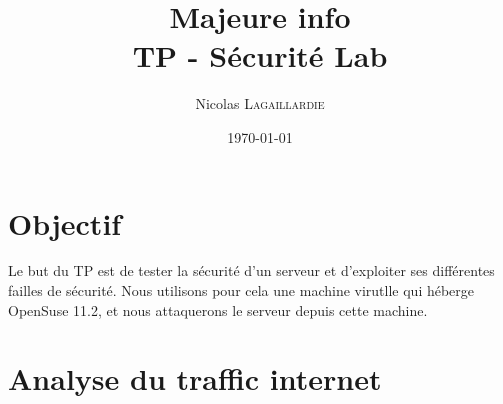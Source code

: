 \documentclass{article}
\title{Majeure info \\ TP - Sécurité Lab} %
\author{Nicolas \textsc{Lagaillardie}} %
\date{\today} %
\begin{document}
\maketitle %

\tableofcontents
\newpage




\section{Objectif}

Le but du TP est de tester la sécurité d'un serveur et d'exploiter ses différentes failles de sécurité. Nous utilisons pour cela une machine virutlle qui héberge OpenSuse 11.2, et nous attaquerons le serveur depuis cette machine.
 

\section{Analyse du traffic internet}
\end{document}

